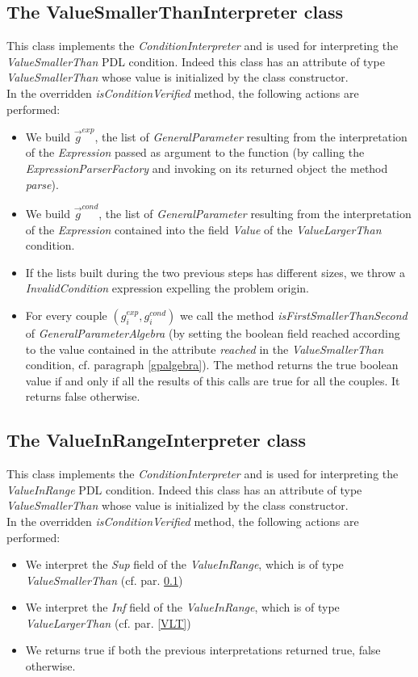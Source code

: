 \documentclass[a4paper,11pt] {ivoa}
\begin{document}
\subsection{The ValueSmallerThanInterpreter class}\label{VST}
This class implements the  {\it ConditionInterpreter} and is used for interpreting the {\it ValueSmallerThan} PDL condition. Indeed this class has an attribute of type {\it ValueSmallerThan} whose value is initialized by the class constructor. \\
In the overridden {\it isConditionVerified} method, the following actions are performed:
\begin{itemize}
\item We build $\vec g^{exp}$, the list of {\it GeneralParameter} resulting from the interpretation of the {\it Expression} passed as argument to the function (by calling the {\it ExpressionParserFactory} and invoking on its returned object the method {\it parse}).
\item We build $\vec g^{cond}$, the list of {\it GeneralParameter} resulting from the interpretation of the {\it Expression} contained into the field {\it Value} of the {\it ValueLargerThan} condition.
\item If the lists built during the two previous steps has different sizes, we throw a {\it InvalidCondition} expression expelling the problem origin. 
\item For every couple $(g_i^{exp}, g_i^{cond})$ we call the method  {\it isFirstSmallerThanSecond} of {\it GeneralParameterAlgebra} (by setting the boolean field reached according to the value contained in the attribute {\it reached} in the  {\it ValueSmallerThan} condition, cf. paragraph \ref{gpalgebra}). The method returns the true boolean value if and only if all the results of this calls are true for all the couples. It returns false otherwise. 
\end{itemize}

\subsection{The ValueInRangeInterpreter class}
This class implements the  {\it ConditionInterpreter} and is used for interpreting the {\it ValueInRange} PDL condition. Indeed this class has an attribute of type {\it ValueSmallerThan} whose value is initialized by the class constructor. \\
In the overridden {\it isConditionVerified} method, the following actions are performed:
\begin{itemize}
\item We interpret the {\it Sup} field of the  {\it ValueInRange}, which is of type {\it ValueSmallerThan} (cf. par. \ref{VST})
\item We interpret the {\it Inf} field of the  {\it ValueInRange}, which is of type {\it ValueLargerThan} (cf. par. \ref{VLT})
\item We returns true if both the previous interpretations returned true, false otherwise.
\end{itemize}
\end{document}
